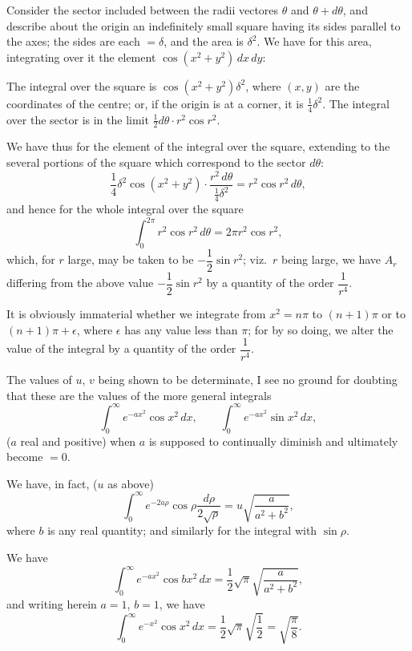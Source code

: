 \documentclass[11pt,a4paper]{book}
\begin{document}
\newpage

Consider the sector included between the radii vectores $\theta$ and $\theta + d\theta$, and describe about the origin an indefinitely small square having its sides parallel to the axes; the sides are each $= \delta$, and the area is $\delta^2$. We have for this area, integrating over it the element $\cos(x^2 + y^2)\,dx\,dy$:

The integral over the square is $\cos(x^2 + y^2)\delta^2$, where $(x,y)$ are the coordinates of the centre; or, if the origin is at a corner, it is $\frac{1}{4}\delta^2$. The integral over the sector is in the limit $\frac{1}{2}d\theta \cdot r^2 \cos r^2$.

We have thus for the element of the integral over the square, extending to the several portions of the square which correspond to the sector $d\theta$:
\[
\frac{1}{4}\delta^2 \cos(x^2 + y^2) \cdot \frac{r^2\,d\theta}{\frac{1}{4}\delta^2} = r^2 \cos r^2\,d\theta,
\]
and hence for the whole integral over the square
\[
\int_0^{2\pi} r^2 \cos r^2\,d\theta = 2\pi r^2 \cos r^2,
\]
which, for $r$ large, may be taken to be $-\dfrac{1}{2}\sin r^2$; viz.\ $r$ being large, we have $A_r$ differing from the above value $-\dfrac{1}{2}\sin r^2$ by a quantity of the order $\dfrac{1}{r^4}$.

\newpage

It is obviously immaterial whether we integrate from $x^2 = n\pi$ to $(n+1)\pi$ or to $(n+1)\pi + \epsilon$, where $\epsilon$ has any value less than $\pi$; for by so doing, we alter the value of the integral by a quantity of the order $\dfrac{1}{r^4}$.

The values of $u$, $v$ being shown to be determinate, I see no ground for doubting that these are the values of the more general integrals
\[
\int_0^{\infty} e^{-ax^2} \cos x^2\,dx, \qquad \int_0^{\infty} e^{-ax^2} \sin x^2\,dx,
\]
($a$ real and positive) when $a$ is supposed to continually diminish and ultimately become $=0$.

We have, in fact, ($u$ as above)
\[
\int_0^{\infty} e^{-2a\rho} \cos \rho \frac{d\rho}{2\sqrt{\rho}} = u \sqrt{\frac{a}{a^2 + b^2}},
\]
where $b$ is any real quantity; and similarly for the integral with $\sin \rho$.

\newpage

We have
\[
\int_0^{\infty} e^{-ax^2} \cos bx^2\,dx = \frac{1}{2} \sqrt{\pi} \sqrt{\frac{a}{a^2 + b^2}},
\]
and writing herein $a = 1$, $b = 1$, we have
\[
\int_0^{\infty} e^{-x^2} \cos x^2\,dx = \frac{1}{2} \sqrt{\pi} \sqrt{\frac{1}{2}} = \sqrt{\frac{\pi}{8}}.
\]
\end{document}
